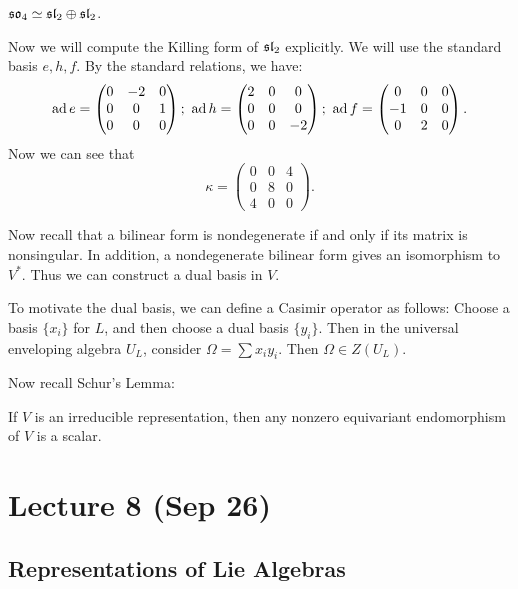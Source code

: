 \documentclass[twoside, 10pt]{article}
\begin{document}
    \begin{prop} $\mathfrak{so}_4 \simeq \mathfrak{sl}_2 \oplus \mathfrak{sl}_2$.  \end{prop}

    Now we will compute the Killing form of $\mathfrak{sl}_2$ explicitly. We will use
        the standard basis $e,h,f$. By the standard relations, we have: \[ \operatorname{ad}
            e = \begin{pmatrix} 0 & -2 & 0 \\ 0 & 0 & 1 \\ 0 & 0 & 0
                \end{pmatrix};\ \operatorname{ad} h = \begin{pmatrix} 2 & 0 & 0 \\ 0 & 0 & 0
                \\ 0 & 0 & -2 \end{pmatrix};\ \operatorname{ad} f = \begin{pmatrix} 0 & 0 & 0
                \\ -1 & 0 & 0 \\ 0 & 2 & 0 \end{pmatrix}. \] Now we can see
                that \[ \kappa = \begin{pmatrix} 0 & 0 & 4 \\ 0 & 8 & 0 \\ 4 &
                0 & 0 \end{pmatrix}.\]

    Now recall that a bilinear form is nondegenerate if and only if its matrix
    is nonsingular. In addition, a nondegenerate bilinear form gives an
    isomorphism to $V^*$. Thus we can construct a dual basis in $V$.

    To motivate the dual basis, we can define a Casimir operator as follows:
    Choose a basis $\{x_i\}$ for $L$, and then choose a dual basis $\{y_i\}$.
    Then in the universal enveloping algebra $U_L$, consider $\Omega = \sum
    x_iy_i$. Then $\Omega \in Z(U_L)$.

    Now recall Schur's Lemma: \begin{lem}[Schur] If $V$ is an irreducible
    representation, then any nonzero equivariant endomorphism of $V$ is a
scalar.  \end{lem}

    \section{Lecture 8 (Sep 26)}%

    \subsection{Representations of Lie Algebras}%
    \label{sub:representations_of_lie_algebras}
    
\end{document}
